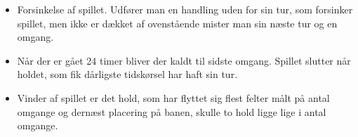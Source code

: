 \documentclass[12pt]{article}
\begin{document}
\begin{itemize}
	\item Forsinkelse af spillet. Udfører man en handling uden for sin tur, som forsinker spillet, men ikke er dækket af ovenstående mister man sin næste tur og en omgang.

	\item Når der er gået 24 timer bliver der kaldt til sidste omgang. Spillet slutter når holdet, som fik dårligste tidskørsel har haft sin tur.

	\item Vinder af spillet er det hold, som har flyttet sig flest felter målt på antal omgange og dernæst placering på banen, skulle to hold ligge lige i antal omgange.

\end{itemize}
\end{document}
